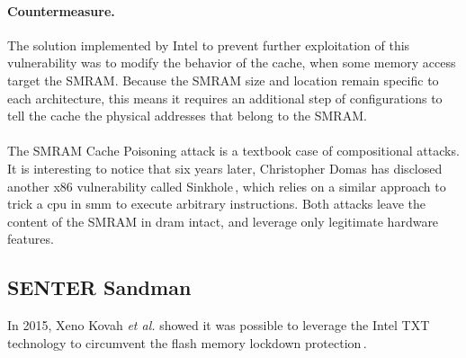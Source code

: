 \paragraph{Countermeasure.}
%
The solution implemented by Intel to prevent further exploitation of this
vulnerability was to modify the behavior of the cache, when some memory access
target the SMRAM.
%
Because the SMRAM size and location remain specific to each architecture, this
means it requires an additional step of configurations to tell the cache the
physical addresses that belong to the SMRAM.

\paragraph{}
%
The SMRAM Cache Poisoning attack is a textbook case of compositional attacks.
%
It is interesting to notice that six years later, Christopher Domas has
disclosed another x86 vulnerability called Sinkhole\,\cite{domas2015sinkhole},
which relies on a similar approach to trick a \ac{cpu} in \ac{smm} to execute
arbitrary instructions. 
%
Both attacks leave the content of the SMRAM in \ac{dram} intact, and leverage
only legitimate hardware features.

\subsection{SENTER Sandman}
\label{subsec:usecase:hse:sandman}

In 2015, Xeno Kovah \emph{et al.} showed it was possible to leverage the Intel
TXT technology to circumvent the flash memory lockdown
protection\,\cite{kovah2015senter}.

